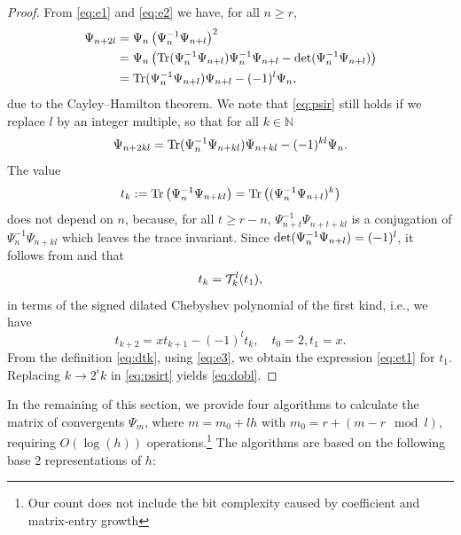 \documentclass[a4paper,fleqn]{cas-sc}
\def\Det{{\rm det}}
\def\Tr{{\rm Tr}}
\def\N{\mathbb{N}}
\begin{document}
\begin{proof}
From \eqref{eq:e1} and \eqref{eq:e2} we have, for all $n\geq r$,
\begin{align}
\Psi_{n+2l}&=\Psi_n\left(\Psi_n^{-1}\Psi_{n+l}\right)^2\notag\\
&=\Psi_n\left(\Tr(\Psi_n^{-1}\Psi_{n+l})\Psi_n^{-1}\Psi_{n+l}-\Det(\Psi_n^{-1}\Psi_{n+l})\right)\notag\\
&=\Tr(\Psi_n^{-1}\Psi_{n+l})\Psi_{n+l}-(-1)^l\Psi_{n},\label{eq:psir}
\end{align}
due to the Cayley--Hamilton theorem. We note that \cref{eq:psir} still holds if we replace $l$ by an integer multiple, so that for all $k\in\N$
\begin{equation}\label{eq:psirt}
\Psi_{n+2kl}=\Tr(\Psi_n^{-1}\Psi_{n+kl})\Psi_{n+kl}-(-1)^{kl}\Psi_{n}.
\end{equation}
The value
\begin{equation}\label{eq:dtk}
t_k:=\Tr\left(\Psi_n^{-1}\Psi_{n+kl}\right)=\Tr\left((\Psi_n^{-1}\Psi_{n+l})^k\right)
\end{equation}
does not depend on $n$, because, for all $t\geq r-n$, $\Psi_{n+t}^{-1}\Psi_{n+t+kl}$ is a conjugation of $\Psi_n^{-1}\Psi_{n+kl}$ which leaves the trace invariant. Since $\Det(\Psi_n^{-1}\Psi_{n+l})=(-1)^l$, it follows from  and  that
\begin{equation}\label{eq:tf}
t_k={\cal T}_k^l(t_1),
\end{equation}
in terms of the signed dilated Chebyshev polynomial of the first kind, i.e., we have
\begin{equation} \label{eq:tr}
t_{k+2}=xt_{k+1}-(-1)^lt_k,\quad t_0=2, t_1=x.
\end{equation}
From the definition \eqref{eq:dtk}, using \eqref{eq:e3}, we obtain the expression \eqref{eq:et1} for $t_1$.
Replacing $k\rightarrow 2^ik$ in \eqref{eq:psirt} yields \eqref{eq:dobl}.
\end{proof}
In the remaining of this section, we provide four algorithms to calculate the matrix of convergents $\Psi_m$, where
$m=m_0+lh$ with $m_0=r+\left(m-r \mod l\right)$, requiring $O(\log(h))$ operations.\footnote{Our count does not include the bit complexity caused by coefficient and matrix-entry growth}
The algorithms are based on the following base 2 representations of $h$:
\end{document}

